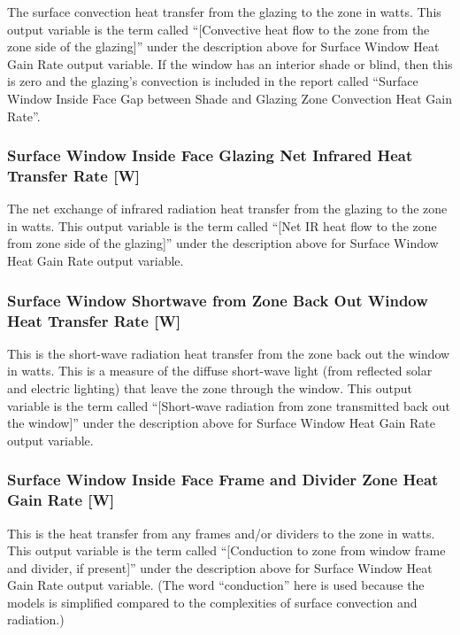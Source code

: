 The surface convection heat transfer from the glazing to the zone in watts. This output variable is the term called ``{[}Convective heat flow to the zone from the zone side of the glazing{]}'' under the description above for Surface Window Heat Gain Rate output variable. If the window has an interior shade or blind, then this is zero and the glazing's convection is included in the report called ``Surface Window Inside Face Gap between Shade and Glazing Zone Convection Heat Gain Rate''.

\subsubsection{Surface Window Inside Face Glazing Net Infrared Heat Transfer Rate {[}W{]}}\label{surface-window-inside-face-glazing-net-infrared-heat-transfer-rate-w}

The net exchange of infrared radiation heat transfer from the glazing to the zone in watts. This output variable is the term called ``{[}Net IR heat flow to the zone from zone side of the glazing{]}'' under the description above for Surface Window Heat Gain Rate output variable.

\subsubsection{Surface Window Shortwave from Zone Back Out Window Heat Transfer Rate {[}W{]}}\label{surface-window-shortwave-from-zone-back-out-window-heat-transfer-rate-w}

This is the short-wave radiation heat transfer from the zone back out the window in watts. This is a measure of the diffuse short-wave light (from reflected solar and electric lighting) that leave the zone through the window. This output variable is the term called ``{[}Short-wave radiation from zone transmitted back out the window{]}'' under the description above for Surface Window Heat Gain Rate output variable.

\subsubsection{Surface Window Inside Face Frame and Divider Zone Heat Gain Rate {[}W{]}}\label{surface-window-inside-face-frame-and-divider-zone-heat-gain-rate-w}

This is the heat transfer from any frames and/or dividers to the zone in watts. This output variable is the term called ``{[}Conduction to zone from window frame and divider, if present{]}'' under the description above for Surface Window Heat Gain Rate output variable. (The word ``conduction'' here is used because the models is simplified compared to the complexities of surface convection and radiation.)

